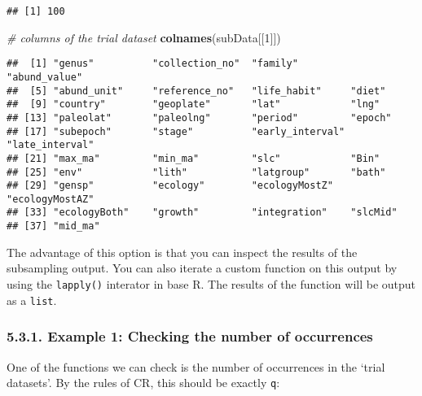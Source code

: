 \documentclass[]{article}
\newenvironment{Shaded}{\begin{snugshade}}{\end{snugshade}}
\newcommand{\CommentTok}[1]{\textcolor[rgb]{0.56,0.35,0.01}{\textit{#1}}}
\newcommand{\ControlFlowTok}[1]{\textcolor[rgb]{0.13,0.29,0.53}{\textbf{#1}}}
\newcommand{\DecValTok}[1]{\textcolor[rgb]{0.00,0.00,0.81}{#1}}
\newcommand{\KeywordTok}[1]{\textcolor[rgb]{0.13,0.29,0.53}{\textbf{#1}}}
\newcommand{\NormalTok}[1]{#1}
\newcommand{\OperatorTok}[1]{\textcolor[rgb]{0.81,0.36,0.00}{\textbf{#1}}}
\newcommand{\StringTok}[1]{\textcolor[rgb]{0.31,0.60,0.02}{#1}}
\begin{document}
\begin{verbatim}
## [1] 100
\end{verbatim}

\begin{Shaded}
\begin{Highlighting}[]
\CommentTok{# columns of the trial dataset}
\KeywordTok{colnames}\NormalTok{(subData[[}\DecValTok{1}\NormalTok{]])}
\end{Highlighting}
\end{Shaded}

\begin{verbatim}
##  [1] "genus"          "collection_no"  "family"         "abund_value"   
##  [5] "abund_unit"     "reference_no"   "life_habit"     "diet"          
##  [9] "country"        "geoplate"       "lat"            "lng"           
## [13] "paleolat"       "paleolng"       "period"         "epoch"         
## [17] "subepoch"       "stage"          "early_interval" "late_interval" 
## [21] "max_ma"         "min_ma"         "slc"            "Bin"           
## [25] "env"            "lith"           "latgroup"       "bath"          
## [29] "gensp"          "ecology"        "ecologyMostZ"   "ecologyMostAZ" 
## [33] "ecologyBoth"    "growth"         "integration"    "slcMid"        
## [37] "mid_ma"
\end{verbatim}

The advantage of this option is that you can inspect the results of the
subsampling output. You can also iterate a custom function on this
output by using the \texttt{lapply()} interator in base R. The results
of the function will be output as a \texttt{list}.

\hypertarget{example-1-checking-the-number-of-occurrences}{%
\subsubsection{5.3.1. Example 1: Checking the number of
occurrences}\label{example-1-checking-the-number-of-occurrences}}

One of the functions we can check is the number of occurrences in the
`trial datasets'. By the rules of CR, this should be exactly \texttt{q}:

\begin{Shaded}
\end{Shaded}
\end{document}
